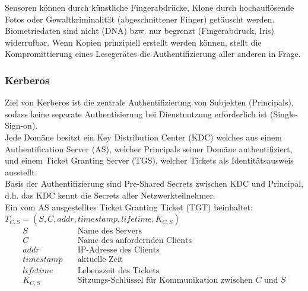 \documentclass[a4paper,12pt,leqno]{article}
\begin{document}
Sensoren können durch künstliche Fingerabdrücke, Klone durch hochauflösende Fotos oder Gewaltkriminalität (abgeschnittener Finger) getäuscht werden.\\
Biometriedaten sind nicht (DNA) bzw. nur begrenzt (Fingerabdruck, Iris) widerrufbar.
Wenn Kopien prinzipiell erstellt werden können, stellt die Kompromittierung eines Lesegerätes die Authentifizierung aller anderen in Frage.

\subsubsection{Kerberos}

Ziel von Kerberos ist die zentrale Authentifizierung von Subjekten (Principals), sodass keine separate Authentisierung bei Dienstnutzung erforderlich ist (Single-Sign-on).\\
Jede Domäne besitzt ein Key Distribution Center (KDC) welches aus einem Authentification Server (AS), welcher Principals seiner Domäne authentifiziert, und einem Ticket Granting Server (TGS), welcher Tickets als Identitätsausweis ausstellt.\\
Basis der Authentifizierung sind Pre-Shared Secrets zwischen KDC und Principal, d.h. das KDC kennt die Secrets aller Netzwerkteilnehmer.\\

Ein vom AS ausgestelltes Ticket Granting Ticket (TGT) beinhaltet:\\
$T_{C,S}= (S,C,addr,timestamp,lifetime,K_{C,S})$
\begin{align*}
S & \quad\textrm{Name des Servers}\\
C & \quad\textrm{Name des anfordernden Clients}\\
addr &\quad \textrm{IP-Adresse des Clients}\\
timestamp &\quad  \textrm{aktuelle Zeit}\\
lifetime &\quad \textrm{Lebenszeit des Tickets}\\
K_{C,S} &\quad \textrm{Sitzungs-Schlüssel für Kommunikation zwischen $C$ und $S$}
\end{align*}
\end{document}
